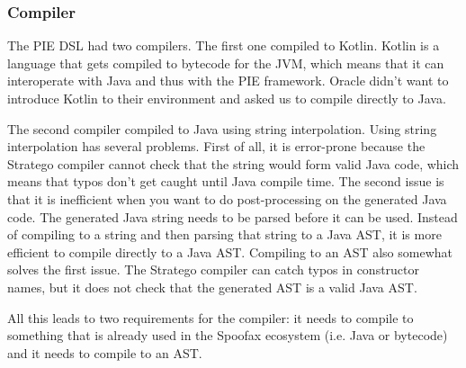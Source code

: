 \subsubsection{Compiler}
The PIE DSL had two compilers.
The first one compiled to Kotlin.
Kotlin is a language that gets compiled to bytecode for the JVM, which means that it can interoperate with Java and thus with the PIE framework.
Oracle didn't want to introduce Kotlin to their environment and asked us to compile directly to Java.

The second compiler compiled to Java using string interpolation.
Using string interpolation has several problems.
First of all, it is error-prone because the Stratego compiler cannot check that the string would form valid Java code, which means that typos don't get caught until Java compile time.
The second issue is that it is inefficient when you want to do post-processing on the generated Java code.
The generated Java string needs to be parsed before it can be used.
Instead of compiling to a string and then parsing that string to a Java AST, it is more efficient to compile directly to a Java AST.
Compiling to an AST also somewhat solves the first issue.
The Stratego compiler can catch typos in constructor names, but it does not check that the generated AST is a valid Java AST.

All this leads to two requirements for the compiler: it needs to compile to something that is already used in the Spoofax ecosystem (i.e. Java or bytecode) and it needs to compile to an AST.

